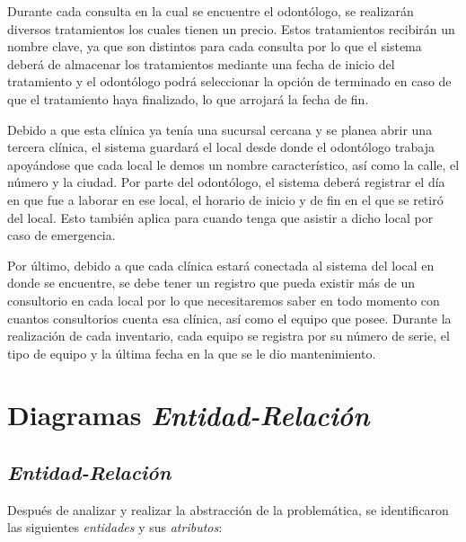 \documentclass[a4paper,12pt]{article}
\begin{document}
\vspace{0.5cm}

Durante cada consulta en la cual se encuentre el odontólogo, se realizarán diversos tratamientos los cuales tienen un precio. Estos tratamientos recibirán un nombre clave, ya que son distintos para cada consulta por lo que el sistema deberá de almacenar los tratamientos mediante una fecha de inicio del tratamiento y el odontólogo podrá seleccionar la opción de terminado en caso de que el tratamiento haya finalizado, lo que arrojará la fecha de fin.\par

\vspace{0.5cm}

Debido a que esta clínica ya tenía una sucursal cercana y se planea abrir una tercera clínica, el sistema guardará el local desde donde el odontólogo trabaja apoyándose que cada local le demos un nombre característico, así como la calle, el número y la ciudad. Por parte del odontólogo, el sistema deberá registrar el día en que fue a laborar en ese local, el horario de inicio y de fin en el que se retiró del local. Esto también aplica para cuando tenga que asistir a dicho local por caso de emergencia.\par

\vspace{0.5cm}

Por último, debido a que cada clínica estará conectada al sistema del local en donde se encuentre, se debe tener un registro que pueda existir más de un consultorio en cada local por lo que necesitaremos saber en todo momento con cuantos consultorios cuenta esa clínica, así como el equipo que posee. Durante la realización de cada inventario, cada equipo se registra por su número de serie, el tipo de equipo y la última fecha en la que se le dio mantenimiento.\par

\vspace{0.5cm}

\section{Diagramas \textit{Entidad-Relación}}
\subsection{\textit{Entidad-Relación}}

Después de analizar y realizar la abstracción de la problemática, se identificaron las siguientes \emph{entidades} y sus \emph{atributos}:\\
\end{document}
